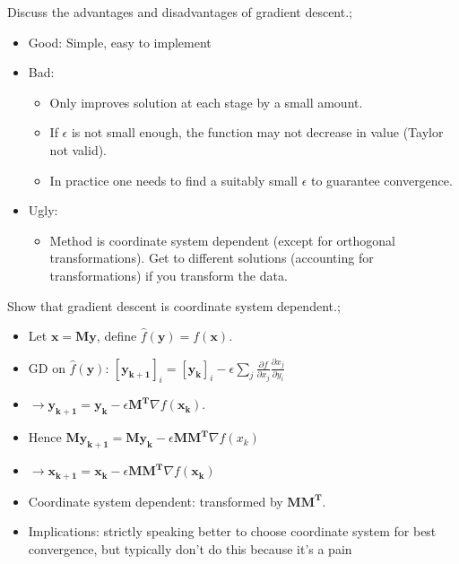\documentclass{article}
\begin{document}
Discuss the advantages and disadvantages of gradient descent.; \begin{itemize}
	\item Good: Simple, easy to implement
	\item Bad: 
	\begin{itemize}
		\item Only improves solution at each stage by a small amount.
		\item If $\epsilon$ is not small enough, the function may not decrease in value (Taylor not valid). \item In practice one needs to find a suitably small $\epsilon$ to guarantee convergence.
	\end{itemize}
\item Ugly: \begin{itemize}
	\item Method is coordinate system dependent (except for orthogonal transformations). Get to different solutions (accounting for transformations) if you transform the data.
\end{itemize}

\end{itemize}
Show that gradient descent is coordinate system dependent.; \begin{itemize}
	\item Let $\mathbf{x=My}$, define $\hat{f}(\mathbf{y})=f(\mathbf{x})$.
	\item GD on $\hat{f}(\mathbf{y})$: $[\mathbf{y_{k+1}}]_i = [\mathbf{y_k}]_i - \epsilon \sum_j \frac{\partial f}{\partial x_j}\frac{\partial x_j}{\partial y_i}$ \item $\rightarrow \mathbf{y_{k+1}} = \mathbf{y_k} - \epsilon \mathbf{M^T}\nabla f(\mathbf{x_k})$.
	\item Hence $\mathbf{My_{k+1}=My_k}-\epsilon \mathbf{MM^T}\nabla f(x_k)$ \item $\rightarrow \mathbf{x_{k+1}}=\mathbf{x_k}-\epsilon\mathbf{MM^T}\nabla f(\mathbf{x_k})$
	\item Coordinate system dependent: transformed by $\mathbf{MM^T}$.
	\item Implications: strictly speaking better to choose coordinate system for best convergence, but typically don't do this because it's a pain
\end{itemize}
\end{document}
